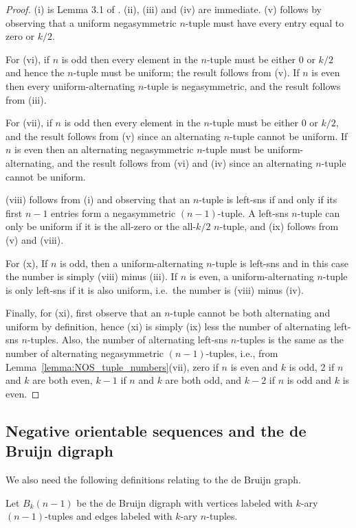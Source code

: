\documentclass[a4paper,11pt]{article}
\theoremstyle{plain}
\theoremstyle{definition}
\theoremstyle{remark}
\begin{document}
\begin{proof}
(i) is Lemma 3.1 of \cite{Mitchell25a}.  (ii), (iii) and (iv) are immediate.  (v) follows by
observing that a uniform negasymmetric $n$-tuple must have every entry equal to zero or $k/2$.

For (vi), if $n$ is odd then every element in the $n$-tuple must be either 0 or $k/2$ and hence the
$n$-tuple must be uniform; the result follows from (v).  If $n$ is even then every
uniform-alternating $n$-tuple is negasymmetric, and the result follows from (iii).

For (vii), if $n$ is odd then every element in the $n$-tuple must be either 0 or $k/2$, and the
result follows from (v) since an alternating $n$-tuple cannot be uniform.  If $n$ is even then an
alternating negasymmetric $n$-tuple must be uniform-alternating, and the result follows from (vi)
and (iv) since an alternating $n$-tuple cannot be uniform.

(viii) follows from (i) and observing that an $n$-tuple is left-sns if and only if its first $n-1$
entries form a negasymmetric $(n-1)$-tuple.  A left-sns $n$-tuple can only be uniform if it is the
all-zero or the all-$k/2$ $n$-tuple, and (ix) follows from (v) and (viii).

For (x), If $n$ is odd, then a uniform-alternating $n$-tuple is left-sns and in this case the
number is simply (viii) minus (iii).  If $n$ is even, a uniform-alternating $n$-tuple is only
left-sns if it is also uniform, i.e.\ the number is (viii) minus (iv).

Finally, for (xi), first observe that an $n$-tuple cannot be both alternating and uniform by
definition, hence (xi) is simply (ix) less the number of alternating left-sns $n$-tuples.  Also,
the number of alternating left-sns $n$-tuples is the same as the number of alternating
negasymmetric $(n-1)$-tuples, i.e., from Lemma~\ref{lemma:NOS_tuple_numbers}(vii), zero if $n$ is
even and $k$ is odd, 2 if $n$ and $k$ are both even, $k-1$ if $n$ and $k$ are both odd, and $k-2$
if $n$ is odd and $k$ is even.
\end{proof}

\subsection{Negative orientable sequences and the de Bruijn digraph}

We also need the following definitions relating to the de Bruijn graph.

Let $B_k(n-1)$ be the de Bruijn digraph with vertices labeled with $k$-ary $(n-1)$-tuples and edges
labeled with $k$-ary $n$-tuples.
\end{document}

